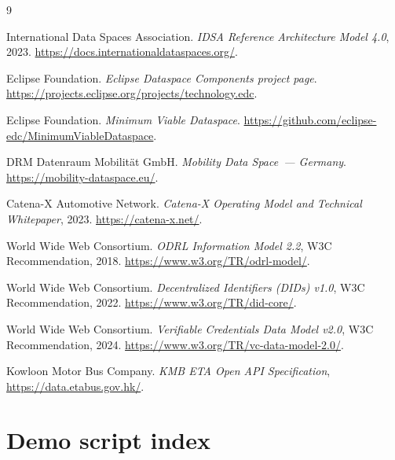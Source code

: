 \documentclass[11pt,a4paper]{article}
\begin{document}
\begin{thebibliography}{9}

International Data Spaces Association.
\emph{IDSA Reference Architecture Model 4.0}, 2023.
\url{https://docs.internationaldataspaces.org/}.

Eclipse Foundation.
\emph{Eclipse Dataspace Components project page}.
\url{https://projects.eclipse.org/projects/technology.edc}.

Eclipse Foundation.
\emph{Minimum Viable Dataspace}.
\url{https://github.com/eclipse-edc/MinimumViableDataspace}.

DRM Datenraum Mobilität GmbH.
\emph{Mobility Data Space~--- Germany}.
\url{https://mobility-dataspace.eu/}.

Catena-X Automotive Network.
\emph{Catena-X Operating Model and Technical Whitepaper}, 2023.
\url{https://catena-x.net/}.

World Wide Web Consortium.
\emph{ODRL Information Model 2.2}, W3C Recommendation, 2018.
\url{https://www.w3.org/TR/odrl-model/}.

World Wide Web Consortium.
\emph{Decentralized Identifiers (DIDs) v1.0}, W3C Recommendation, 2022.
\url{https://www.w3.org/TR/did-core/}.

World Wide Web Consortium.
\emph{Verifiable Credentials Data Model v2.0}, W3C Recommendation, 2024.
\url{https://www.w3.org/TR/vc-data-model-2.0/}.

Kowloon Motor Bus Company.
\emph{KMB ETA Open API Specification},
\url{https://data.etabus.gov.hk/}.

\end{thebibliography}

\appendix
\section{Demo script index}
\label{app:scripts}
\end{document}
